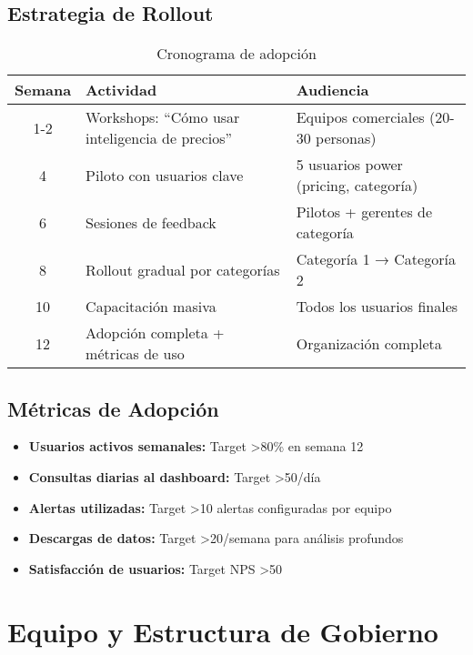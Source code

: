 \documentclass[12pt,a4paper]{article}
\begin{document}
\subsection{Estrategia de Rollout}

\begin{table}[h]
\centering
\begin{tabularx}{\textwidth}{|c|X|X|}
\hline
\rowcolor{lightgray}
\textbf{Semana} & \textbf{Actividad} & \textbf{Audiencia} \\
\hline
1-2 & Workshops: ``Cómo usar inteligencia de precios'' & Equipos comerciales (20-30 personas) \\
\hline
4 & Piloto con usuarios clave & 5 usuarios power (pricing, categoría) \\
\hline
6 & Sesiones de feedback & Pilotos + gerentes de categoría \\
\hline
8 & Rollout gradual por categorías & Categoría 1 → Categoría 2 \\
\hline
10 & Capacitación masiva & Todos los usuarios finales \\
\hline
12 & Adopción completa + métricas de uso & Organización completa \\
\hline
\end{tabularx}
\caption{Cronograma de adopción}
\end{table}

\subsection{Métricas de Adopción}

\begin{itemize}[leftmargin=*]
    \item \textbf{Usuarios activos semanales:} Target >80\% en semana 12
    \item \textbf{Consultas diarias al dashboard:} Target >50/día
    \item \textbf{Alertas utilizadas:} Target >10 alertas configuradas por equipo
    \item \textbf{Descargas de datos:} Target >20/semana para análisis profundos
    \item \textbf{Satisfacción de usuarios:} Target NPS >50
\end{itemize}

\newpage
\section{Equipo y Estructura de Gobierno}
\end{document}
